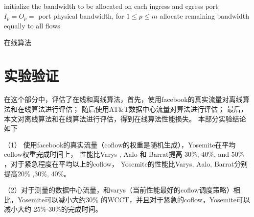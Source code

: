    \begin{algorithm} 
 initialize the bandwidth to be allocated on each ingress and egress port: $I_p=O_p=$ port physical bandwidth, for $1 \le p \le m$\;
allocate remaining bandwidth equally to all flows\;
\caption{在线算法}
   \label{IWCCM-online-algorithm}
 \end{algorithm}
  

 
\section{实验验证}
在这个部分中，评估了在线和离线算法，首先，使用facebook\cite{chowdhury2014efficient}的真实流量对离线算法和在线算法进行评估；
随后使用AT\&T数据中心流量对算法进行评估；
最后，本文对离线算法和在线算法进行评估，得到在线算法性能损失。
本部分实验结论如下

（1） 使用facebook\cite{chowdhury2014efficient}的真实流量（coflow的权重是随机生成），Yosemite在平均coflow权重完成时间上， 性能比Varys \cite{chowdhury2014efficient}, Aalo \cite{chowdhury2015efficient} 和 Barrat提高  $30\%$, $40\%$, and $50\%$，对于紧急程度在平均以上的coflow，
Yosemite的性能比Varys, Aalo, Barrat分别提高$20\%$ ,$ 30\%$,  $40\%$。

（2）对于测量的数据中心流量，和varys（当前性能最好的coflow调度策略）相比，Yosemite可以减小大约30\% 的WCCT，并且对于紧急的coflow，Yosemite可以减小大约 25\%-30\%的完成时间。

